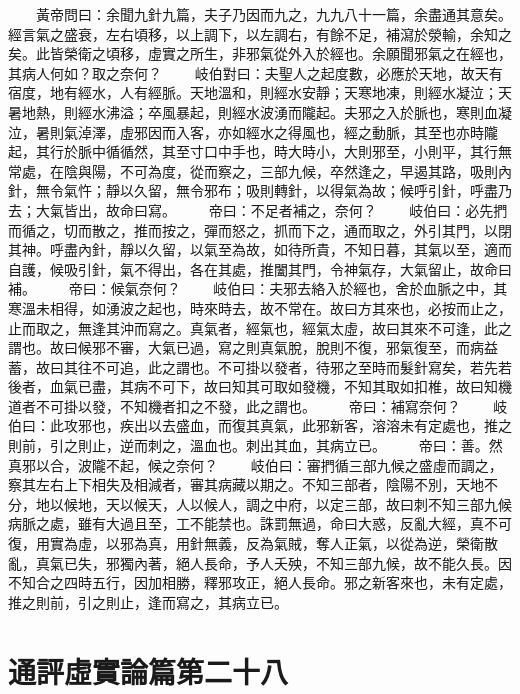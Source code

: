 　　黃帝問曰：余聞九針九篇，夫子乃因而九之，九九八十一篇，余盡通其意矣。經言氣之盛衰，左右頃移，以上調下，以左調右，有餘不足，補瀉於滎輸，余知之矣。此皆榮衛之頃移，虛實之所生，非邪氣從外入於經也。余願聞邪氣之在經也，其病人何如？取之奈何？
　　岐伯對曰：夫聖人之起度數，必應於天地，故天有宿度，地有經水，人有經脈。天地溫和，則經水安靜；天寒地凍，則經水凝泣；天暑地熱，則經水沸溢；卒風暴起，則經水波湧而隴起。夫邪之入於脈也，寒則血凝泣，暑則氣淖澤，虛邪因而入客，亦如經水之得風也，經之動脈，其至也亦時隴起，其行於脈中循循然，其至寸口中手也，時大時小，大則邪至，小則平，其行無常處，在陰與陽，不可為度，從而察之，三部九候，卒然逢之，早遏其路，吸則內針，無令氣忤；靜以久留，無令邪布；吸則轉針，以得氣為故；候呼引針，呼盡乃去；大氣皆出，故命曰寫。
　　帝曰：不足者補之，奈何？
　　岐伯曰：必先捫而循之，切而散之，推而按之，彈而怒之，抓而下之，通而取之，外引其門，以閉其神。呼盡內針，靜以久留，以氣至為故，如待所貴，不知日暮，其氣以至，適而自護，候吸引針，氣不得出，各在其處，推闔其門，令神氣存，大氣留止，故命曰補。
　　帝曰：候氣奈何？
　　岐伯曰：夫邪去絡入於經也，舍於血脈之中，其寒溫未相得，如湧波之起也，時來時去，故不常在。故曰方其來也，必按而止之，止而取之，無逢其沖而寫之。真氣者，經氣也，經氣太虛，故曰其來不可逢，此之謂也。故曰候邪不審，大氣已過，寫之則真氣脫，脫則不復，邪氣復至，而病益蓄，故曰其往不可追，此之謂也。不可掛以發者，待邪之至時而髮針寫矣，若先若後者，血氣已盡，其病不可下，故曰知其可取如發機，不知其取如扣椎，故曰知機道者不可掛以發，不知機者扣之不發，此之謂也。
　　帝曰：補寫奈何？
　　岐伯曰：此攻邪也，疾出以去盛血，而復其真氣，此邪新客，溶溶未有定處也，推之則前，引之則止，逆而刺之，溫血也。刺出其血，其病立已。
　　帝曰：善。然真邪以合，波隴不起，候之奈何？
　　岐伯曰：審捫循三部九候之盛虛而調之，察其左右上下相失及相減者，審其病藏以期之。不知三部者，陰陽不別，天地不分，地以候地，天以候天，人以候人，調之中府，以定三部，故曰刺不知三部九候病脈之處，雖有大過且至，工不能禁也。誅罰無過，命曰大惑，反亂大經，真不可復，用實為虛，以邪為真，用針無義，反為氣賊，奪人正氣，以從為逆，榮衛散亂，真氣已失，邪獨內著，絕人長命，予人夭殃，不知三部九候，故不能久長。因不知合之四時五行，因加相勝，釋邪攻正，絕人長命。邪之新客來也，未有定處，推之則前，引之則止，逢而寫之，其病立已。


\section{通評虛實論篇第二十八}

